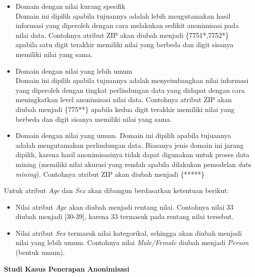\documentclass[a4paper,twoside]{article}
\begin{document}
\begin{enumerate}
\begin{itemize}
\item Domain dengan nilai kurang spesifik\\
Domain ini dipilih apabila tujuannya adalah lebih mengutamakan hasil informasi yang diperoleh dengan cara melakukan sedikit anonimisasi pada nilai data. Contohnya atribut ZIP akan diubah menjadi \{7751*,7752*\} apabila satu digit terakhir memiliki nilai yang berbeda dan digit sisanya memiliki nilai yang sama.
\item Domain dengan nilai yang lebih umum\\
Domain ini dipilih apabila tujuannya adalah menyeimbangkan nilai informasi yang diperoleh dengan tingkat perlindungan data yang didapat dengan cara meningkatkan level anonimisasi nilai data. Contohnya atribut ZIP akan diubah menjadi \{775**\} apabila kedua digit terakhir memiliki nilai yang berbeda dan digit sisanya memiliki nilai yang sama.
\item Domain dengan nilai yang umum.
Domain ini dipilih apabila tujuannya adalah mengutamakan perlindungan data. Biasanya jenis domain ini jarang dipilih, karena hasil anonimisasinya tidak dapat digunakan untuk proses data mining (memiliki nilai akurasi yang rendah apabila dilakukan pemodelan \textit{data mining}). Contohnya atribut ZIP akan diubah menjadi \{*****\}

\end{itemize}

\noindent Untuk atribut \textit{Age} dan \textit{Sex} akan dibangun berdasarkan ketentuan berikut: 
\begin{itemize}
\item Nilai atribut \textit{Age} akan diubah menjadi rentang nilai. Contohnya nilai 33  diubah menjadi [30-39], karena 33 termasuk pada rentang nilai tersebut.
\item Nilai atribut \textit{Sex} termasuk nilai kategorikal, sehingga akan diubah menjadi nilai yang lebih umum. Contohnya nilai \textit{Male/Female} diubah menjadi \textit{Person} (bentuk umum).
\end{itemize}
		
\textbf{Studi Kasus Penerapan Anonimisasi}


\end{enumerate}
\end{document}
